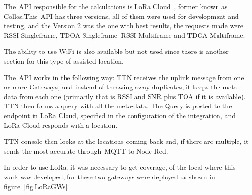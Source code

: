 The~\gls{API} responsible for the calculations is LoRa Cloud~\cite{LoRACloud}, former known as Collos.This~\gls{API} has three versions, all of them were used for development and testing, and the Version 2 was the one with best results, the requests made were RSSI Singleframe, TDOA Singleframe, RSSI Multiframe and TDOA Multiframe. 

The ability to use WiFi is also available but not used since there is another section for this type of assisted location. 

The~\gls{API} works in the following way: TTN receives the uplink message from one or more Gateways, and instead of throwing away duplicates, it keeps the meta-data from each one (primarily that is RSSI and SNR plus TOA if it is available).
TTN then forms a query with all the meta-data. The Query is posted to the endpoint in LoRa Cloud, specified in the configuration of the integration, and LoRa Cloud responds with a location.

TTN console then looks at the locations coming back and, if there are multiple, it sends the most accurate through~\gls{MQTT} to Node-Red.

In order to use LoRa, it was necessary to get coverage, of the local where this work was developed, for these two gateways were deployed as shown in figure~\ref{fig:LoRaGWs}.



